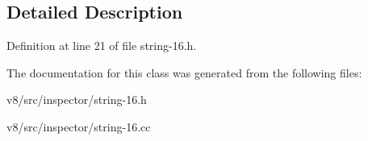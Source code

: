 \subsection{Detailed Description}


Definition at line 21 of file string-\/16.\+h.



The documentation for this class was generated from the following files\+:\begin{DoxyCompactItemize}
\item 
v8/src/inspector/string-\/16.\+h\item 
v8/src/inspector/string-\/16.\+cc\end{DoxyCompactItemize}

